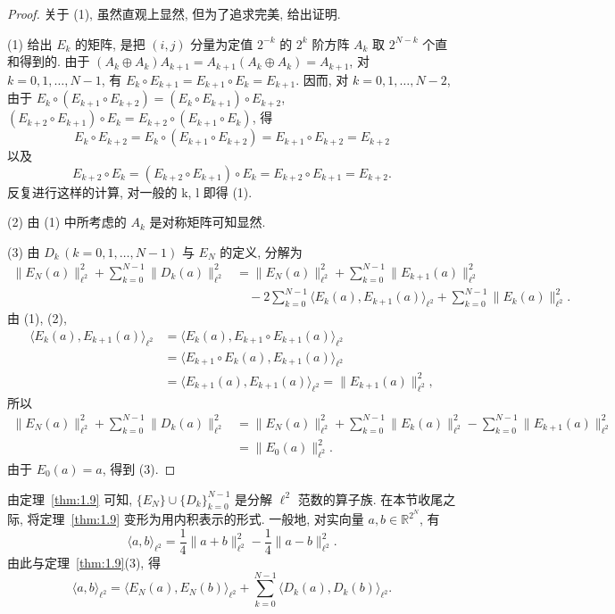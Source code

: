 \begin{proof}
关于 (1), 虽然直观上显然, 但为了追求完美, 给出证明.

(1) 给出 $E_{k}$ 的矩阵, 是把 $(i,j)$ 分量为定值 $2^{-k}$ 的 $2^{k}$ 阶方阵 $A_{k}$ 取 $2^{N-k}$ 个直和得到的. 由于 $(A_{k} \oplus A_{k})A_{k+1} = A_{k+1}(A_{k} \oplus A_{k}) = A_{k+1}$, 对 $k = 0, 1, \ldots, N-1$, 有 $E_{k} \circ E_{k+1} = E_{k+1} \circ E_{k} = E_{k+1}$. 因而, 对 $k = 0, 1, \ldots, N-2$, 由于 $E_{k} \circ (E_{k+1} \circ E_{k+2}) = (E_{k} \circ E_{k+1}) \circ E_{k+2}$, $(E_{k+2} \circ E_{k+1}) \circ E_{k} = E_{k+2} \circ (E_{k+1} \circ E_{k})$, 得
\[
E_{k} \circ E_{k+2} = E_{k} \circ (E_{k+1} \circ E_{k+2}) = E_{k+1} \circ E_{k+2} = E_{k+2}
\]
以及
\[
E_{k+2} \circ E_{k} = (E_{k+2} \circ E_{k+1}) \circ E_{k} = E_{k+2} \circ E_{k+1} = E_{k+2}.
\]
反复进行这样的计算, 对一般的 k, l 即得 (1).

(2) 由 (1) 中所考虑的 $A_{k}$ 是对称矩阵可知显然.

(3) 由 $D_{k}\,(k = 0, 1, \ldots, N-1)$ 与 $E_{N}$ 的定义, 分解为
\begin{align*}
\|E_{N}(a)\|_{\ell^{2}}^{2} + \sum_{k=0}^{N-1}\|D_{k}(a)\|_{\ell^{2}}^{2}
&= \|E_{N}(a)\|_{\ell^{2}}^{2} + \sum_{k=0}^{N-1}\|E_{k+1}(a)\|_{\ell^{2}}^{2} \\
&\quad - 2\sum_{k=0}^{N-1}\langle E_{k}(a), E_{k+1}(a)\rangle_{\ell^{2}} + \sum_{k=0}^{N-1}\|E_{k}(a)\|_{\ell^{2}}^{2}.
\end{align*}
由 (1), (2),
\begin{align*}
\langle E_{k}(a), E_{k+1}(a)\rangle_{\ell^{2}} &= \langle E_{k}(a), E_{k+1} \circ E_{k+1}(a)\rangle_{\ell^{2}} \\
&= \langle E_{k+1} \circ E_{k}(a), E_{k+1}(a)\rangle_{\ell^{2}} \\
&= \langle E_{k+1}(a), E_{k+1}(a)\rangle_{\ell^{2}} = \|E_{k+1}(a)\|_{\ell^{2}}^{2},
\end{align*}
所以
\begin{align*}
\|E_{N}(a)\|_{\ell^{2}}^{2} + \sum_{k=0}^{N-1}\|D_{k}(a)\|_{\ell^{2}}^{2}
&= \|E_{N}(a)\|_{\ell^{2}}^{2} + \sum_{k=0}^{N-1}\|E_{k}(a)\|_{\ell^{2}}^{2} - \sum_{k=0}^{N-1}\|E_{k+1}(a)\|_{\ell^{2}}^{2} \\
&= \|E_{0}(a)\|_{\ell^{2}}^{2}.
\end{align*}
由于 $E_{0}(a) = a$, 得到 (3).
\end{proof}

由定理~\ref{thm:1.9} 可知, $\{E_{N}\} \cup \{D_{k}\}_{k=0}^{N-1}$ 是分解 $\ell^{2}$ 范数的算子族. 在本节收尾之际, 将定理~\ref{thm:1.9} 变形为用内积表示的形式. 一般地, 对实向量 $a, b \in \mathbb{R}^{2^{N}}$, 有
\[
\langle a, b \rangle_{\ell^{2}} = \frac{1}{4}\|a + b\|_{\ell^{2}}^{2} - \frac{1}{4}\|a - b\|_{\ell^{2}}^{2}.
\]
由此与定理~\ref{thm:1.9}(3), 得
\begin{equation}\tag{1.15}
\langle a, b \rangle_{\ell^{2}} = \langle E_{N}(a), E_{N}(b)\rangle_{\ell^{2}} + \sum_{k=0}^{N-1}\langle D_{k}(a), D_{k}(b)\rangle_{\ell^{2}}.
\label{eq:1.15}
\end{equation}


